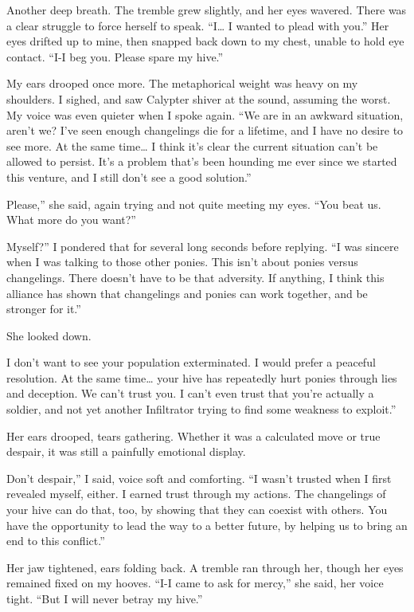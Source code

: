 Another deep breath. The tremble grew slightly, and her eyes wavered. There was a clear struggle to force herself to speak. “I… I wanted to plead with you.” Her eyes drifted up to mine, then snapped back down to my chest, unable to hold eye contact. “I-I beg you. Please spare my hive.”

My ears drooped once more. The metaphorical weight was heavy on my shoulders. I sighed, and saw Calypter shiver at the sound, assuming the worst. My voice was even quieter when I spoke again. “We are in an awkward situation, aren’t we? I’ve seen enough changelings die for a lifetime, and I have no desire to see more. At the same time… I think it’s clear the current situation can’t be allowed to persist. It’s a problem that’s been hounding me ever since we started this venture, and I still don’t see a good solution.”

\leavevmode{}Please,” she said, again trying and not quite meeting my eyes. “You beat us. What more do you want?”

\leavevmode{}Myself?” I pondered that for several long seconds before replying. “I was sincere when I was talking to those other ponies. This isn’t about ponies versus changelings. There doesn’t have to be that adversity. If anything, I think this alliance has shown that changelings and ponies can work together, and be stronger for it.”

She looked down.

\leavevmode{}I don’t want to see your population exterminated. I would prefer a peaceful resolution. At the same time… your hive has repeatedly hurt ponies through lies and deception. We can’t trust you. I can’t even trust that you’re actually a soldier, and not yet another Infiltrator trying to find some weakness to exploit.”

Her ears drooped, tears gathering. Whether it was a calculated move or true despair, it was still a painfully emotional display.

\leavevmode{}Don’t despair,” I said, voice soft and comforting. “I wasn’t trusted when I first revealed myself, either. I earned trust through my actions. The changelings of your hive can do that, too, by showing that they can coexist with others. You have the opportunity to lead the way to a better future, by helping us to bring an end to this conflict.”

Her jaw tightened, ears folding back. A tremble ran through her, though her eyes remained fixed on my hooves. “I-I came to ask for mercy,” she said, her voice tight. “But I will never betray my hive.”

